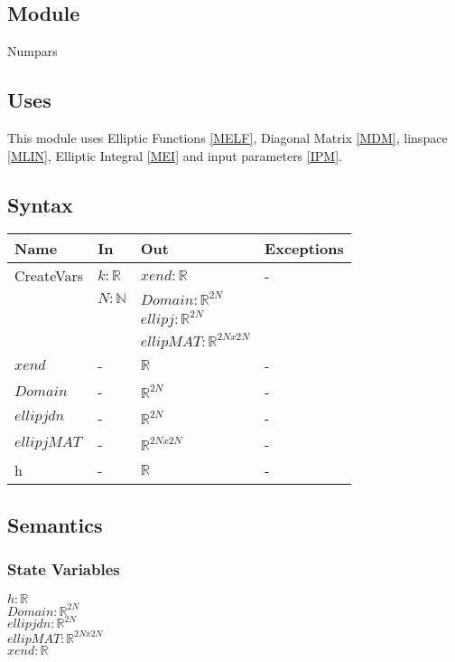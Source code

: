 \documentclass[12pt, titlepage]{article}
\begin{document}
\subsection{Module}

Numpars

\subsection{Uses}

This module uses Elliptic Functions \ref{MELF}, Diagonal Matrix \ref{MDM}, 
linspace \ref{MLIN}, Elliptic 
Integral \ref{MEI} and input parameters \ref{IPM}. 

\subsection{Syntax}

\begin{center}
	\begin{tabular}{p{3cm} p{3cm} p{7cm} >{\raggedright\arraybackslash}p{3cm}}
		\toprule
		\textbf{Name} & \textbf{In} & \textbf{Out} & \textbf{Exceptions} \\
		\hline
		CreateVars & $k :\mathbb{R}$ & 
		$xend: \mathbb{R}$ & - \\ 
		  &$N: \mathbb{N}$ & $Domain:\mathbb{R}^{2N}$ &  \\
		  &  & $ellipj: \mathbb{R}^{2N}$ &  \\ 
		  &  & $ellipMAT: \mathbb{R}^{2Nx2N}$ &  \\
		$xend$ & - & $\mathbb{R}$ & - \\
		$Domain$ & - & $\mathbb{R}^{2N}$ &- \\
		$ellipjdn$ & - & $\mathbb{R}^{2N}$ &- \\
		$ellipjMAT$ & - & $\mathbb{R}^{2Nx2N}$ &- \\
		h & - & $\mathbb{R}$ & -\\ 
		\hline
	\end{tabular}
\end{center}

\subsection{Semantics}

\subsubsection{State Variables}
$h :\mathbb{R}$ \\  
$Domain:\mathbb{R}^{2N}$ \\  
$ellipjdn: \mathbb{R}^{2N}$ \\ 
$ellipMAT: \mathbb{R}^{2Nx2N}$ \\  
$xend: \mathbb{R} $
\end{document}
